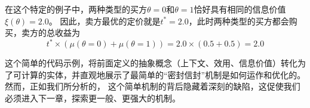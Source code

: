 在这个特定的例子中，两种类型的买方$\theta=0$和$\theta=1$恰好具有相同的信息价值$\xi(\theta)=2.0$。
因此，卖方最优的定价就是$t^\ast=2.0$，此时两种类型的买方都会购买，卖方的总收益为
$$t^\ast \times (\mu(\theta=0) + \mu(\theta=1)) = 2.0 \times (0.5 + 0.5) = 2.0$$

这个简单的代码示例，将前面定义的抽象概念（上下文、效用、信息价值）转化为了可计算的实体，并直观地展示了最简单的“密封信封”机制是如何运作和优化的。然而，正如我们所分析的，
这个简单机制的背后隐藏着深刻的缺陷，这促使我们必须进入下一章，探索更一般、更强大的机制。
